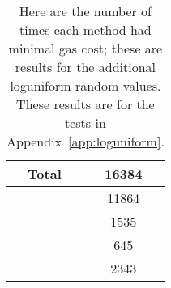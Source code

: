 \begin{table}[pt]
\centering
\begin{tabular}{|c|S[table-format=5.0]|}
\hline
Total & 16384 \\
\hline
{} \UnrolledThree{} &  11864 \\
\WhileOne{}      &  1535 \\
\WhileTwo{}      &   645 \\
\WhileThree{}    &  2343 \\
\hline
\end{tabular}
\caption[Minimal Gas Costs Statistics]{Here are the number of times
    each method had minimal gas cost;
    these are results for the additional loguniform random values.
    These results are for the tests in Appendix~\ref{app:loguniform}.
    }
\label{table:minimal_gas_costs_er}
\end{table}
